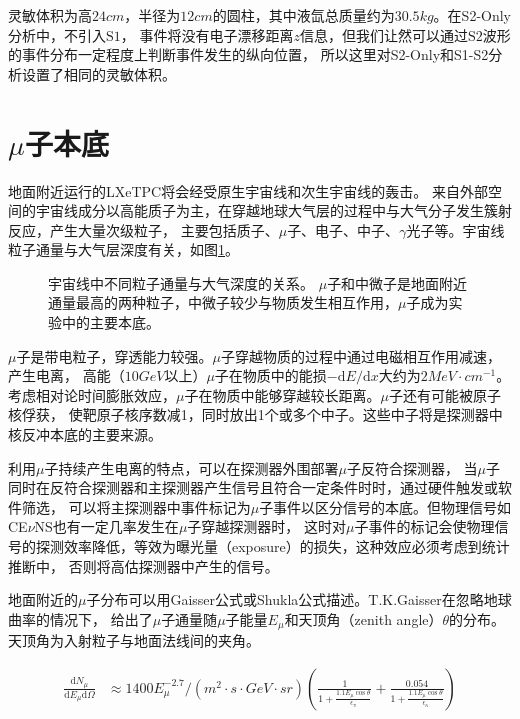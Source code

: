 灵敏体积为高$24\si{cm}$，半径为$12\si{cm}$的圆柱，其中液氙总质量约为$30.5\si{kg}$。在S2-Only分析中，不引入$\mathrm{S1}$，
事件将没有电子漂移距离$z$信息，但我们让然可以通过$\mathrm{S2}$波形的事件分布一定程度上判断事件发生的纵向位置，
所以这里对S2-Only和S1-S2分析设置了相同的灵敏体积。

\section{$\mu$子本底}

地面附近运行的LXeTPC将会经受原生宇宙线和次生宇宙线的轰击。
来自外部空间的宇宙线成分以高能质子为主，在穿越地球大气层的过程中与大气分子发生簇射反应，产生大量次级粒子，
主要包括质子、$\mu$子、电子、中子、$\gamma$光子等。宇宙线粒子通量与大气层深度有关，如图\ref{fig:vertical_flux}。

\begin{figure}
    \centering
    
    \caption{\label{fig:vertical_flux} 宇宙线中不同粒子通量与大气深度的关系\cite{olive_review_2016}。
    $\mu$子和中微子是地面附近通量最高的两种粒子，中微子较少与物质发生相互作用，$\mu$子成为实验中的主要本底。}
\end{figure}

$\mu$子是带电粒子，穿透能力较强。$\mu$子穿越物质的过程中通过电磁相互作用减速，产生电离，
高能（$10\si{GeV}$以上）$\mu$子在物质中的能损$-\mathrm{d}E/\mathrm{d}x$大约为$2\si{MeV\cdot cm^{-1}}$。
考虑相对论时间膨胀效应，$\mu$子在物质中能够穿越较长距离。$\mu$子还有可能被原子核俘获，
使靶原子核序数减1，同时放出1个或多个中子。这些中子将是探测器中核反冲本底的主要来源。

利用$\mu$子持续产生电离的特点，可以在探测器外围部署$\mu$子反符合探测器，
当$\mu$子同时在反符合探测器和主探测器产生信号且符合一定条件时时，通过硬件触发或软件筛选，
可以将主探测器中事件标记为$\mu$子事件以区分信号的本底。但物理信号如CE$\nu$NS也有一定几率发生在$\mu$子穿越探测器时，
这时对$\mu$子事件的标记会使物理信号的探测效率降低，等效为曝光量（exposure）的损失，这种效应必须考虑到统计推断中，
否则将高估探测器中产生的信号。

地面附近的$\mu$子分布可以用Gaisser公式或Shukla公式描述。T.K.Gaisser在忽略地球曲率的情况下，
给出了$\mu$子通量随$\mu$子能量$E_\mu$和天顶角（zenith angle）$\theta$的分布。天顶角为入射粒子与地面法线间的夹角\cite{gaisser_cosmic_2016}。

\begin{align}
    \label{eq:gaisser}
    \frac{\mathrm{d}N_\mu}{\mathrm{d}E_\mu\mathrm{d}\Omega} &\approx 
    1400E_\mu^{-2.7}/\left(\si{m^2\cdot s\cdot GeV\cdot sr}\right)\left(\frac{1}{1+\frac{1.1E_\mu\cos\theta}{\epsilon_\pi}}+\frac{0.054}{1+\frac{1.1E_\mu\cos\theta}{\epsilon_\kappa}}\right)
\end{align}


